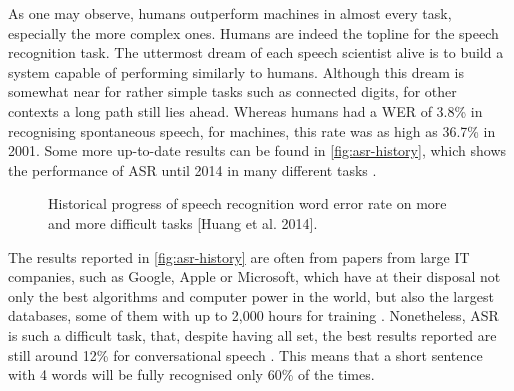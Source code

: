 As one may observe, humans outperform machines in almost every task, especially the more complex ones. 
Humans are indeed the topline for the speech recognition task. The uttermost dream of each speech 
scientist alive is to build a system capable of performing similarly to humans. Although this dream is somewhat near
for rather simple tasks such as connected digits, for other contexts a long path still lies ahead. Whereas humans had a WER of 3.8\% in recognising spontaneous speech, for machines, this rate was as high as 36.7\% in 2001. Some more up-to-date results can be found in \autoref{fig:asr-history}, which shows the performance of \ac{ASR} until 2014 in many different tasks \cite{Huang2014}. 

\begin{figure}[!ht]
        \noindent{}
        \caption{Historical progress of speech recognition word error rate on more and more
difficult tasks [Huang et al. 2014].}
        \label{fig:asr-history}
\end{figure}

The results reported in \autoref{fig:asr-history} are often from papers from large IT companies, such as Google, Apple or Microsoft, which have at their disposal not only the best algorithms and computer power in the world, but also the largest databases, some of them with up to 2,000 hours for training \cite{Huang2014}. Nonetheless, \ac{ASR} is such a difficult task, that, despite having all set, the best results reported are still around 12\% for conversational speech  \cite{Huang2014}. This means that a short sentence with 4 words will be fully recognised only 60\% of the times. 

